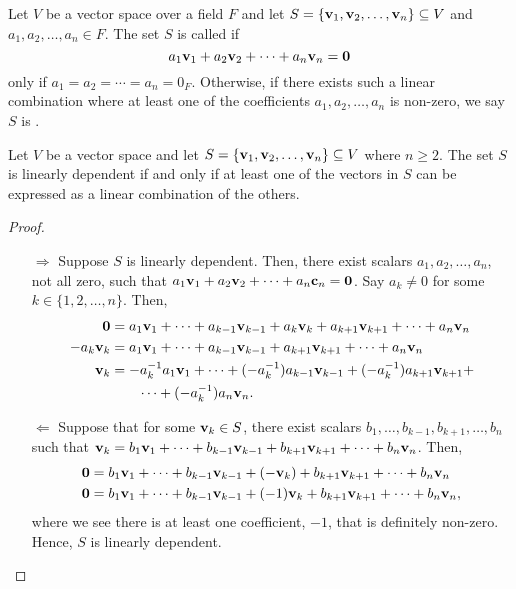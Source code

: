 \begin{defn}
Let $ V $ be a vector space over a field $ F $ and let $ S=\{\mathbf{v}_1,\mathbf{v}_2,\ldots,\mathbf{v}_n\}\subseteq V $ and $ a_1,a_2,\ldots,a_n\in F $. The set $ S $ is called  if
\begin{equation*}
    a_1\mathbf{v}_1+a_2\mathbf{v}_2+\cdots+a_n\mathbf{v}_n=\mathbf{0}
\end{equation*}
only if $ a_1=a_2=\cdots=a_n=0_F $. Otherwise, if there exists such a linear combination where at least one of the coefficients $ a_1,a_2,\ldots,a_n $ is non-zero, we say $ S $ is .
\end{defn}

\begin{thm}
Let $ V $ be a vector space and let $ S=\{\mathbf{v}_1,\mathbf{v}_2,\ldots,\mathbf{v}_n\}\subseteq V $ where $ n\geq 2 $. The set $ S $ is linearly dependent if and only if at least one of the vectors in $ S $ can be expressed as a linear combination of the others.
\end{thm}
\begin{proof}~
\begin{enumerate}
    \item[$ \Rightarrow $] Suppose $ S $ is linearly dependent. Then, there exist scalars $ a_1,a_2,\ldots,a_n $, not all zero, such that $ a_1\mathbf{v}_1+a_2\mathbf{v}_2+\cdots+a_n\mathbf{c}_n=\mathbf{0} $. Say $ a_k\neq 0 $ for some $ k\in\{1,2,\ldots,n\} $. Then,
    \begin{align*}
        \mathbf{0} &= a_1\mathbf{v}_1+\cdots+a_{k-1}\mathbf{v}_{k-1}+a_k\mathbf{v}_k+a_{k+1}\mathbf{v}_{k+1}+\cdots+a_n\mathbf{v}_n \\
        -a_k\mathbf{v}_k &= a_1\mathbf{v}_1+\cdots+a_{k-1}\mathbf{v}_{k-1}+a_{k+1}\mathbf{v}_{k+1}+\cdots+a_n\mathbf{v}_n \\
        \mathbf{v}_k &= -a_k^{-1}a_1\mathbf{v}_1+\cdots+(-a_k^{-1})a_{k-1}\mathbf{v}_{k-1}+(-a_k^{-1})a_{k+1}\mathbf{v}_{k+1}+ \\
        &\qquad \cdots+(-a_k^{-1})a_n\mathbf{v}_n.
    \end{align*}

    \item[$ \Leftarrow $] Suppose that for some $ \mathbf{v}_k\in S $, there exist scalars $ b_1,\ldots,b_{k-1},b_{k+1},\ldots,b_n $ such that $ \mathbf{v}_k=b_1\mathbf{v}_1+\cdots+b_{k-1}\mathbf{v}_{k-1}+b_{k+1}\mathbf{v}_{k+1}+\cdots+b_n\mathbf{v}_n $. Then,
    \begin{align*}
        \mathbf{0} &= b_1\mathbf{v}_1+\cdots+b_{k-1}\mathbf{v}_{k-1}+(-\mathbf{v}_k)+b_{k+1}\mathbf{v}_{k+1}+\cdots+b_n\mathbf{v}_n \\
        \mathbf{0} &= b_1\mathbf{v}_1+\cdots+b_{k-1}\mathbf{v}_{k-1}+(-1)\mathbf{v}_k+b_{k+1}\mathbf{v}_{k+1}+\cdots+b_n\mathbf{v}_n,
    \end{align*}
    where we see there is at least one coefficient, $ -1 $, that is definitely non-zero. Hence, $ S $ is linearly dependent.\qedhere
\end{enumerate}
\end{proof}

